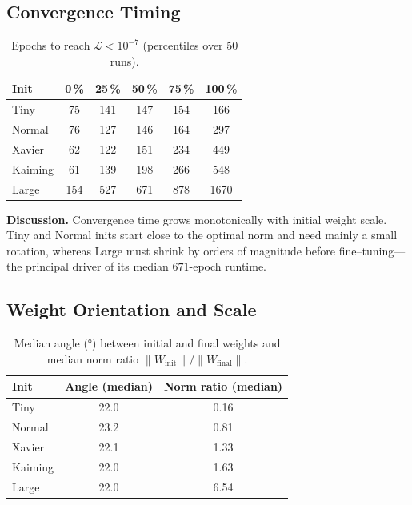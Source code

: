 \subsection*{Convergence Timing}

\begin{table}[h]
\centering
\caption{Epochs to reach $\mathcal L<10^{-7}$ (percentiles over 50 runs).}
\label{tab:init-epochs}
\begin{tabular}{lccccc}
\toprule
Init & 0\,\% & 25\,\% & 50\,\% & 75\,\% & 100\,\% \\
\midrule
Tiny    & 75  & 141 & 147 & 154 & 166 \\
Normal  & 76  & 127 & 146 & 164 & 297 \\
Xavier  & 62  & 122 & 151 & 234 & 449 \\
Kaiming & 61  & 139 & 198 & 266 & 548 \\
Large   & 154 & 527 & 671 & 878 & 1670 \\
\bottomrule
\end{tabular}
\end{table}

\textbf{Discussion.}  
Convergence time grows monotonically with initial weight scale.  Tiny and
Normal inits start close to the optimal norm and need mainly a small rotation,
whereas Large must shrink by orders of magnitude before fine–tuning—the
principal driver of its median $671$-epoch runtime.

\subsection*{Weight Orientation and Scale}

\begin{table}[h]
\centering
\caption{Median angle (°) between initial and final weights and median
norm ratio $\lVert W_{\text{init}}\rVert / \lVert W_{\text{final}}\rVert$.}
\label{tab:init-angle-norm}
\begin{tabular}{lcc}
\toprule
Init & Angle (median) & Norm ratio (median) \\
\midrule
Tiny    & 22.0 & 0.16 \\
Normal  & 23.2 & 0.81 \\
Xavier  & 22.1 & 1.33 \\
Kaiming & 22.0 & 1.63 \\
Large   & 22.0 & 6.54 \\
\bottomrule
\end{tabular}
\end{table}

